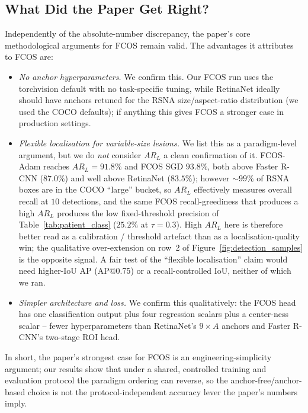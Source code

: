 \documentclass[11pt,a4paper]{article}
\begin{document}
\subsection{What Did the Paper Get Right?}
Independently of the absolute-number discrepancy, the paper's core methodological arguments for FCOS remain valid. The advantages it attributes to FCOS are:
\begin{itemize}[nosep]
    \item \emph{No anchor hyperparameters.} We confirm this. Our FCOS run uses the torchvision default with no task-specific tuning, while RetinaNet ideally should have anchors retuned for the RSNA size/aspect-ratio distribution (we used the COCO defaults); if anything this gives FCOS a stronger case in production settings.
    \item \emph{Flexible localisation for variable-size lesions.} We list this as a paradigm-level argument, but we do \emph{not} consider $AR_L$ a clean confirmation of it. FCOS-Adam reaches $AR_L = 91.8\%$ and FCOS SGD $93.8\%$, both above Faster R-CNN ($87.0\%$) and well above RetinaNet ($83.5\%$); however $\sim 99\%$ of RSNA boxes are in the COCO ``large'' bucket, so $AR_L$ effectively measures overall recall at $10$ detections, and the same FCOS recall-greediness that produces a high $AR_L$ produces the low fixed-threshold precision of Table~\ref{tab:patient_class} ($25.2\%$ at $\tau = 0.3$). High $AR_L$ here is therefore better read as a calibration / threshold artefact than as a localisation-quality win; the qualitative over-extension on row~2 of Figure~\ref{fig:detection_samples} is the opposite signal. A fair test of the ``flexible localisation'' claim would need higher-IoU AP (AP@0.75) or a recall-controlled IoU, neither of which we ran.
    \item \emph{Simpler architecture and loss.} We confirm this qualitatively: the FCOS head has one classification output plus four regression scalars plus a center-ness scalar -- fewer hyperparameters than RetinaNet's $9 \times A$ anchors and Faster R-CNN's two-stage ROI head.
\end{itemize}
In short, the paper's strongest case for FCOS is an engineering-simplicity argument; our results show that under a shared, controlled training and evaluation protocol the paradigm ordering can reverse, so the anchor-free/anchor-based choice is not the protocol-independent accuracy lever the paper's numbers imply.
\end{document}
